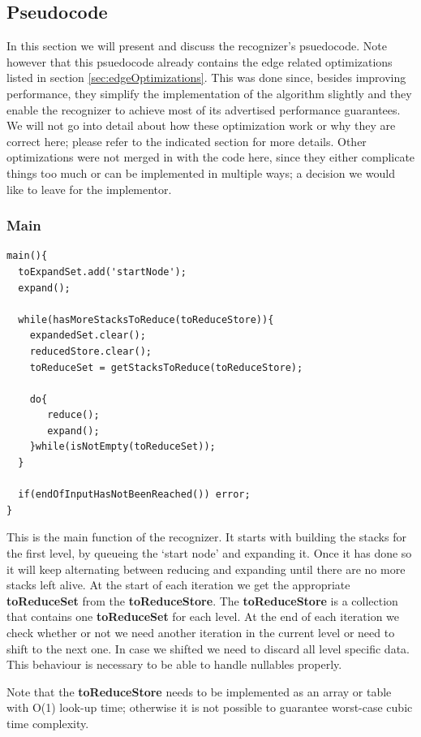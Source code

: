 \documentclass[a4paper,10pt]{article}
\begin{document}
\pagebreak
\subsection{Pseudocode}

In this section we will present and discuss the recognizer's psuedocode. Note however that this psuedocode already contains the edge related optimizations listed in section \ref{sec:edgeOptimizations}. This was done since, besides improving performance, they simplify the implementation of the algorithm slightly and they enable the recognizer to achieve most of its advertised performance guarantees. We will not go into detail about how these optimization work or why they are correct here; please refer to the indicated section for more details. Other optimizations were not merged in with the code here, since they either complicate things too much or can be implemented in multiple ways; a decision we would like to leave for the implementor.

\subsubsection{Main}
{\small
\begin{verbatim}
main(){
  toExpandSet.add('startNode');
  expand();
  
  while(hasMoreStacksToReduce(toReduceStore)){
    expandedSet.clear();
    reducedStore.clear();
    toReduceSet = getStacksToReduce(toReduceStore);
    
    do{
       reduce();
       expand();
    }while(isNotEmpty(toReduceSet));
  }
  
  if(endOfInputHasNotBeenReached()) error;
}
\end{verbatim}
}

This is the main function of the recognizer. It starts with building the stacks for the first level, by queueing the `start node' and expanding it. Once it has done so it will keep alternating between reducing and expanding until there are no more stacks left alive. At the start of each iteration we get the appropriate {\bf toReduceSet} from the {\bf toReduceStore}. The {\bf toReduceStore} is a collection that contains one {\bf toReduceSet} for each level. At the end of each iteration we check whether or not we need another iteration in the current level or need to shift to the next one. In case we shifted we need to discard all level specific data. This behaviour is necessary to be able to handle nullables properly.

Note that the {\bf toReduceStore} needs to be implemented as an array or table with O(1) look-up time; otherwise it is not possible to guarantee worst-case cubic time complexity.
\end{document}
